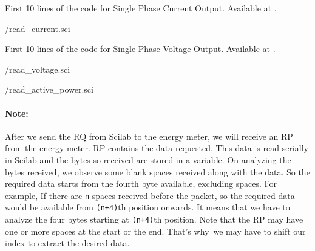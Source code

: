 \begin{scicode}
  {First 10 lines of the code for Single Phase Current Output.
    Available at .}
  \label{sci:current-modbus}
  
  {\LocMODscicode/read_current.sci}
\end{scicode}

\begin{scicode}
  {First 10 lines of the code for Single Phase Voltage Output.
    Available at .}
  \label{sci:voltage-modbus}
  
  {\LocMODscicode/read_voltage.sci}
\end{scicode}

\begin{scicode}
  \label{sci:modbus-power}
  
  {\LocMODscicode/read_active_power.sci}
\end{scicode}

\paragraph{Note: } After we send the RQ from Scilab to the energy meter, we will receive an RP from the energy meter. RP contains the data requested. This data
is read serially in Scilab and the bytes so received are stored in a variable. On analyzing the bytes received, we observe some blank spaces received along with the data. So the required data starts from the fourth byte available, excluding spaces. For example, If there are {\tt n} spaces received before the packet, so the required data would be available from {\tt (n+4)}th position onwards. It means that we have to analyze the four bytes starting at {\tt (n+4)}th position. Note that the RP may have one or more spaces at the start or the end. That's why we may have to shift our index to extract the desired data. 

